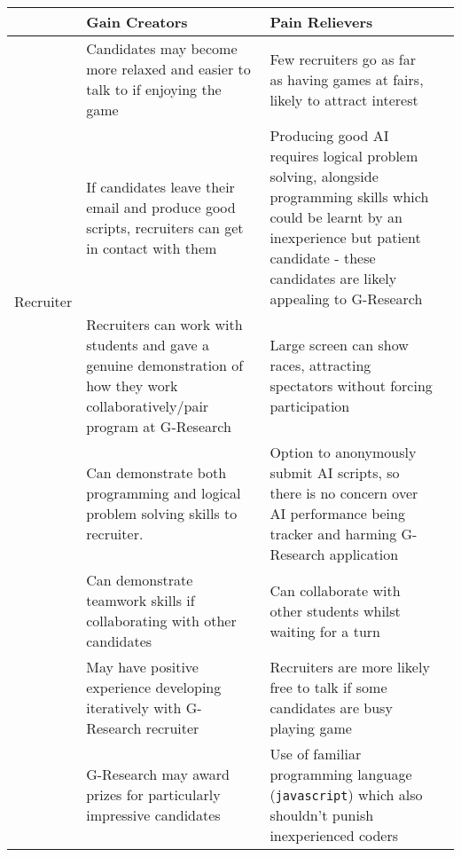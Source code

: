 \begin{tabularx}{\textwidth}{| c | X | X | X |}
\hline
& Gain Creators & Pain Relievers \\ 
\hline\hline
\multirow{4}{*}{Recruiter} 
	       & Candidates may become more relaxed and easier to talk to if enjoying the game
	       & Few recruiters go as far as having games at fairs, likely to attract interest \\ \cline{2-3}

	       & If candidates leave their email and produce good scripts, recruiters can get in contact with them
	       & Producing good AI requires logical problem solving, alongside programming skills which could be learnt by an inexperience but patient candidate - these candidates are likely appealing to G-Research\\ \cline{2-3}

	       & Recruiters can work with students and gave a genuine demonstration of how they work collaboratively/pair program at G-Research
	       & Large screen can show races, attracting spectators without forcing participation\\ 
\hline\hline
\multirow{4}{*}{Student} 
	       & Can demonstrate both programming and logical problem solving skills to recruiter.
	       & Option to anonymously submit AI scripts, so there is no concern over AI performance being tracker and harming G-Research application\\ \cline{2-3}

	       & Can demonstrate teamwork skills if collaborating with other candidates
	       & Can collaborate with other students whilst waiting for a turn\\ \cline{2-3}

	       & May have positive experience developing iteratively with G-Research recruiter
	       & Recruiters are more likely free to talk if some candidates are busy playing game\\ \cline{2-3}
	       
	       & G-Research may award prizes for particularly impressive candidates
	       & Use of familiar programming language ({\tt javascript}) which also shouldn't punish inexperienced coders\\ 
\hline
\end{tabularx}



